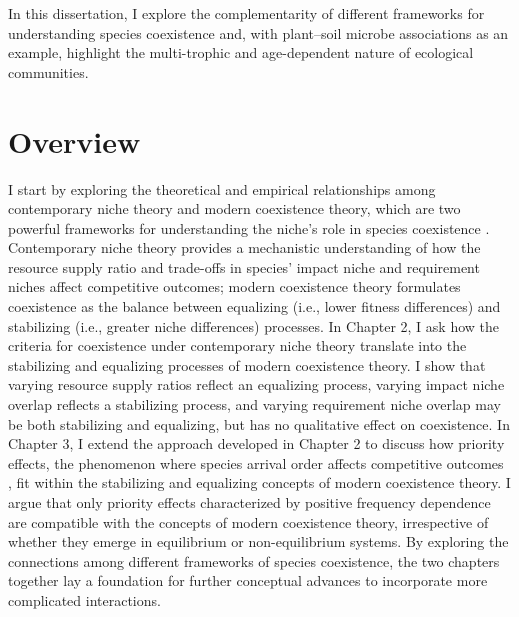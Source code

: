 In this dissertation, I explore the complementarity of different frameworks for understanding species coexistence and, with plant--soil microbe associations as an example, highlight the multi-trophic and age-dependent nature of ecological communities. 
\par



\section{Overview}
I start by exploring the theoretical and empirical relationships among contemporary niche theory and modern coexistence theory, which are two powerful frameworks for understanding the niche's role in species coexistence \citep{Chesson2000, Chase2003}. Contemporary niche theory provides a mechanistic understanding of how the resource supply ratio and trade-offs in species' impact niche and requirement niches affect competitive outcomes; modern coexistence theory formulates coexistence as the balance between equalizing (i.e., lower fitness differences) and stabilizing (i.e., greater niche differences) processes. In Chapter 2, I ask how the criteria for coexistence under contemporary niche theory translate into the stabilizing and equalizing processes of modern coexistence theory. I show that varying resource supply ratios reflect an equalizing process, varying impact niche overlap reflects a stabilizing process, and varying requirement niche overlap may be both stabilizing and equalizing, but has no qualitative effect on coexistence.
In Chapter 3, I extend the approach developed in Chapter 2 to discuss how priority effects, the phenomenon where species arrival order affects competitive outcomes \citep{Fukami2015}, fit within the stabilizing and equalizing concepts of modern coexistence theory. I argue that only priority effects characterized by positive frequency dependence are compatible with the concepts of modern coexistence theory, irrespective of whether they emerge in equilibrium or non-equilibrium systems.
By exploring the connections among different frameworks of species coexistence, the two chapters together lay a foundation for further conceptual advances to incorporate more complicated interactions.
\par


